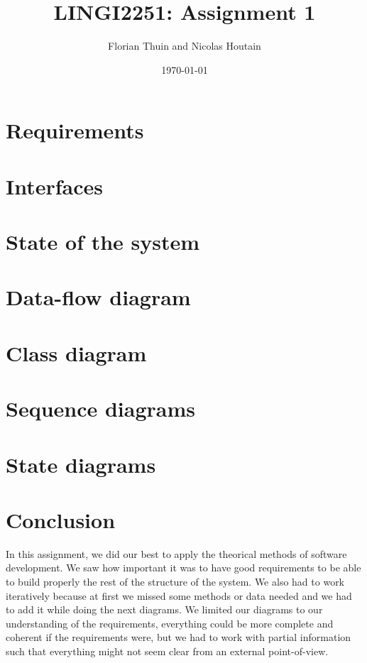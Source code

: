 \documentclass[11pt, a4paper]{article}
\title{LINGI2251: Assignment 1}
\author{Florian Thuin and Nicolas Houtain}
\date{\today}
\begin{document}
\maketitle
\tableofcontents

\section{Requirements}


\section{Interfaces}


\section{State of the system}



\section{Data-flow diagram}



\section{Class diagram}



\section{Sequence diagrams}



\section{State diagrams}


\section{Conclusion}

In this assignment, we did our best to apply the theorical methods of
software development. We saw how important it was to have good
requirements to be able to build properly the rest of the structure of
the system. We also had to work iteratively because at first we missed
some methods or data needed and we had to add it while doing the next
diagrams. We limited our diagrams to our understanding of the
requirements, everything could be more complete and coherent if the
requirements were, but we had to work with partial information such that
everything might not seem clear from an external point-of-view.
\end{document}
